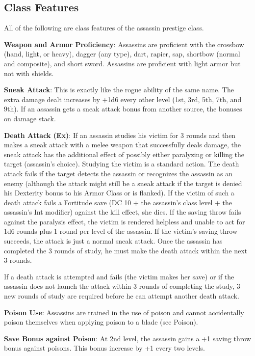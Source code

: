 \subsection{Class Features}

				
All of the following are class features of the assassin prestige class.
				
\textbf{Weapon and Armor Proficiency}: Assassins are proficient with the crossbow (hand, light, or heavy), dagger (any type), dart, rapier, sap, shortbow (normal and composite), and short sword. Assassins are proficient with light armor but not with shields.
				
\textbf{Sneak Attack}: This is exactly like the rogue ability of the same name. The extra damage dealt increases by +1d6 every other level (1st, 3rd, 5th, 7th, and 9th). If an assassin gets a sneak attack bonus from another source, the bonuses on damage stack.
				
\textbf{Death Attack (Ex)}: If an assassin studies his victim for 3 rounds and then makes a sneak attack with a melee weapon that successfully deals damage, the sneak attack has the additional effect of possibly either paralyzing or killing the target (assassin's choice). Studying the victim is a standard action. The death attack fails if the target detects the assassin or recognizes the assassin as an enemy (although the attack might still be a sneak attack if the target is denied his Dexterity bonus to his Armor Class or is flanked). If the victim of such a death attack fails a Fortitude save (DC 10 + the assassin's class level + the assassin's Int modifier) against the kill effect, she dies. If the saving throw fails against the paralysis effect, the victim is rendered helpless and unable to act for 1d6 rounds plus 1 round per level of the assassin. If the victim's saving throw succeeds, the attack is just a normal sneak attack. Once the assassin has completed the 3 rounds of study, he must make the death attack within the next 3 rounds.
				
If a death attack is attempted and fails (the victim makes her save) or if the assassin does not launch the attack within 3 rounds of completing the study, 3 new rounds of study are required before he can attempt another death attack.
				
\textbf{Poison Use}: Assassins are trained in the use of poison and cannot accidentally poison themselves when applying poison to a blade (see Poison).
				
\textbf{Save Bonus against Poison}: At 2nd level, the assassin gains a +1 saving throw bonus against poisons. This bonus increase by +1 every two levels.
				
